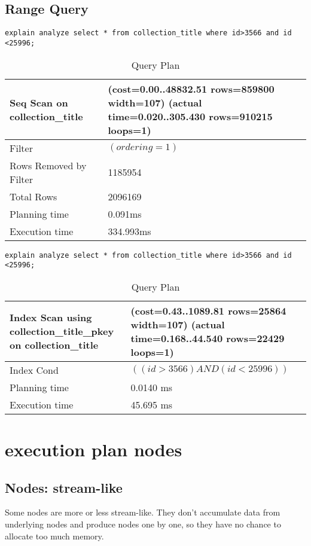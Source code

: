 \documentclass[paper=letter, fontsize=12pt]{article}
\begin{document}
\subsection{Range Query}
\begin{verbatim}
explain analyze select * from collection_title where id>3566 and id <25996;
\end{verbatim}

\begin{longtable}{p{4cm} | p{12cm}}
	\caption{Query Plan}
	\\
	Seq Scan on collection\_title & (cost=0.00..48832.51 rows=859800 width=107) (actual time=0.020..305.430 rows=910215 loops=1)
	\\ \hline
	Filter & $(ordering = 1)$
	\\ \hline
	Rows Removed by Filter & 1185954
	\\ \hline
	Total Rows & 2096169
	\\ \hline
	Planning time & 0.091ms
	\\ \hline
	Execution time & 334.993ms
\end{longtable}


\begin{verbatim}
explain analyze select * from collection_title where id>3566 and id <25996;
\end{verbatim}

\begin{longtable}{p{4cm} | p{12cm}}
	\caption{Query Plan}
	\\
	Index Scan using collection\_title\_pkey on collection\_title & (cost=0.43..1089.81 rows=25864 width=107) (actual time=0.168..44.540 rows=22429 loops=1)
	\\ \hline
	Index Cond & $((id > 3566) AND (id < 25996))$
	\\ \hline
	Planning time & 0.0140 ms
	\\ \hline
	Execution time & 45.695 ms
\end{longtable}

\section{execution plan nodes}
\subsection{Nodes: stream-like}
	Some nodes are more or less stream-like. They don’t accumulate data from underlying nodes and produce nodes one by one, so they have no chance to allocate too much memory.
\end{document}
